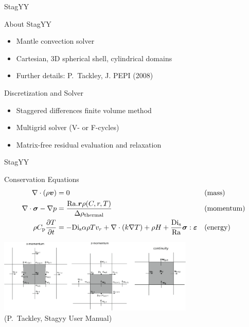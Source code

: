 




\begin{frame}{StagYY}

  \begin{block}{About StagYY}
  \begin{itemize}
   \item Mantle convection solver
   \item Cartesian, 3D spherical shell, cylindrical domains
   \item Further details: P.~Tackley, J. PEPI (2008)
  \end{itemize}
  \end{block}

  \begin{block}{Discretization and Solver}
  \begin{itemize}
   \item Staggered differences finite volume method
   \item Multigrid solver (V- or F-cycles)
   \item Matrix-free residual evaluation and relaxation
  \end{itemize}
  \end{block}

\end{frame}



\begin{frame}{StagYY}

  \begin{block}{Conservation Equations}
         \vspace*{-0.5cm}
        \begin{align*}
          \nabla \cdot (\rho \boldsymbol{v}) &= 0  & & \mathrm{(mass)} \\
          \nabla \cdot \boldsymbol{\sigma}  - \nabla p &=  \frac{\mathrm{Ra}.\boldsymbol{r} \rho(C,r,T)}{\Delta  \rho_{\mathrm{thermal}}} & & \mathrm{(momentum)} \\
          \rho  C_{\mathrm p} \frac{\partial T}{\partial t} &= - \mathrm{Di}_{\mathrm s} \alpha \rho T v_r + \nabla \cdot (k \nabla T) + \rho H + \frac{\mathrm{Di}_{\mathrm s}}{\mathrm{Ra}} \boldsymbol{\sigma} : \boldsymbol{\varepsilon}  & & \mathrm{(energy)} 
         \end{align*}
  \end{block}

  \begin{center}
   \includegraphics[width=0.7\textwidth]{figures/stagyy-discretization} \\
   {\scriptsize (P.~Tackley, Stagyy User Manual)}
  \end{center}

\end{frame}

